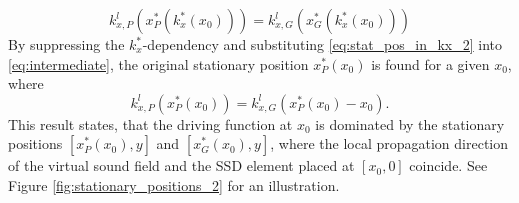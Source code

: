 \documentclass[12pt,a4paper]{article}
\begin{document}
%
\begin{equation} 
k^l_{x,P}(x^*_P(k^*_x(x_0))) = k^l_{x,G}(x^*_G(k^*_x(x_0)))
\label{eq:intermediate}
\end{equation}
By suppressing the $k^*_x$-dependency and substituting \eqref{eq:stat_pos_in_kx_2} into \eqref{eq:intermediate}, the original stationary position $x^*_P(x_0)$ is found for a given $x_0$, where 
\begin{equation}
k^l_{x,P}(x^*_P(x_0)) = k^l_{x,G}(x^*_P(x_0) - x_0).
\label{eq:sdm_Stat_point}
\end{equation}
This result states, that the driving function at $x_0$ is dominated by the stationary positions $[x^*_P(x_0), y]$ and $[x^*_G(x_0), y]$, where the local propagation direction of the virtual sound field and the SSD element placed at $[x_0, 0]$ coincide.
See Figure \ref{fig:stationary_positions_2} for an illustration.
\end{document}
